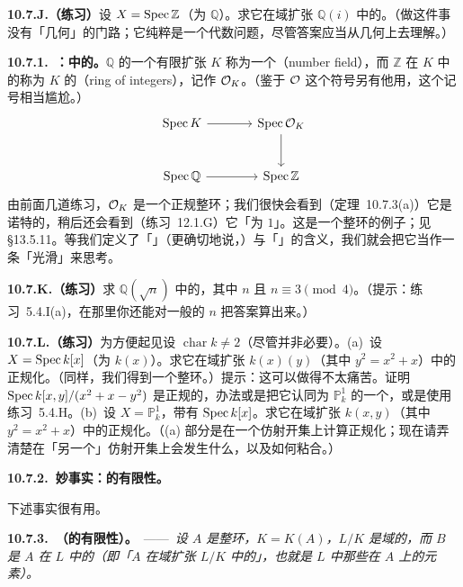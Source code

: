 \textbf{10.7.J.（练习）}\quad 设 $X=\operatorname{Spec}\mathbb{Z}$（\trFunctionField{}为 $\mathbb{Q}$）。求它在域扩张 $\mathbb{Q}(i)$ 中的\trIntegralClosure。（做这件事没有「几何」的门路；它纯粹是一个代数问题，尽管答案应当从几何上去理解。）

\textbf{10.7.1.\ \trhRemark{}：\trNumberField{}中的\trRingOfIntegers{}。}\quad $\mathbb{Q}$ 的一个有限扩张 $K$ 称为一个\textbf{\trNumberField{}}（number field），而 $\mathbb{Z}$ 在 $K$ 中的\trIntegralClosure{}称为 $K$ 的\textbf{\trRingOfIntegers{}}（ring of integers），记作 $\mathcal{O}_K$。（鉴于 $\mathcal{O}$ 这个符号另有他用，这个记号相当尴尬。）
\[
\begin{tikzcd}[row sep=2.6em, column sep=3.6em]
\Spec K \ar[r] & \Spec\OO_K \ar[d] \\
\Spec\mathbb{Q} \ar[r] & \Spec\mathbb{Z}
\end{tikzcd}
\]
由前面几道练习，$\mathcal{O}_K$ 是一个正规整环；我们很快会看到（定理~10.7.3(a)）它是诺特的，稍后还会看到（\mbox{练习~12.1.G}）它「\trDimension{}为 $1$」。这是一个\trDedekind{}整环的例子；见 \S13.5.11。等我们定义了「\trSmooth」（更确切地说，\trRegular）与「\trCurve」的含义，我们就会把它当作一条「光滑」\trCurve{}来思考。

\textbf{10.7.K.（练习）}\quad 求 $\mathbb{Q}(\sqrt{n})$ 中的\trRingOfIntegers{}，其中 $n$ \trSquareFree{}且 $n\equiv 3\pmod{4}$。（提示：\mbox{练习~5.4.I}(a)，在那里你还能对一般的\trSquareFree{} $n$ 把答案算出来。）

\textbf{10.7.L.（练习）}\quad 为方便起见设 $\operatorname{char}k\neq 2$（尽管并非必要）。(a)~设 $X=\operatorname{Spec} k[x]$（\trFunctionField{}为 $k(x)$）。求它在域扩张 $k(x)(y)$（其中 $y^2=x^2+x$）中的正规化。（同样，我们得到一个\trDedekind{}整环。）提示：这可以做得不太痛苦。证明 $\operatorname{Spec} k[x,y]/(x^2+x-y^2)$ 是正规的，办法或是把它认同为 $\mathbb{P}^1_k$ 的一个\trOpenSubset，或是使用\mbox{练习~5.4.H}。(b)~设 $X=\mathbb{P}^1_k$，带有\trDistinguishedOpen\trSubscheme{} $\operatorname{Spec} k[x]$。求它在域扩张 $k(x,y)$（其中 $y^2=x^2+x$）中的正规化。（(a) 部分是在一个仿射开集上计算正规化；现在请弄清楚在「另一个」仿射开集上会发生什么，以及如何粘合。）

\textbf{10.7.2.\ 妙事实：\trIntegralClosure{}的有限性。}

下述事实很有用。

\textbf{10.7.3.\ \trhTheorem{}（\trIntegralClosure{}的有限性）。}\ ——\ \emph{设 $A$ 是\trNoetherian{}整环，$K=K(A)$，$L/K$ 是域的\trFinite{}\trFieldExtension，而 $B$ 是 $A$ 在 $L$ 中的\trIntegralClosure（即「$A$ 在域扩张 $L/K$ 中的\trIntegralClosure{}」，也就是 $L$ 中那些在 $A$ 上\trIntegral{}的元素）。}

